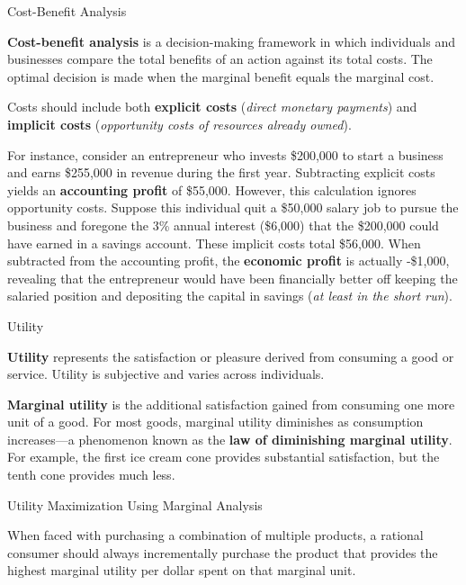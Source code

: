 \documentclass[10pt]{article}
\begin{document}
  \begin{core}{Cost-Benefit Analysis}

    \textbf{Cost-benefit analysis} is a decision-making framework in which individuals and businesses compare the total benefits of an action against its total costs. The optimal decision is made when the marginal benefit equals the marginal cost.

    Costs should include both \textbf{explicit costs} (\textit{direct monetary payments}) and \textbf{implicit costs} (\textit{opportunity costs of resources already owned}).

    For instance, consider an entrepreneur who invests \$200,000 to start a business and earns \$255,000 in revenue during the first year. Subtracting explicit costs yields an \textbf{accounting profit} of \$55,000. However, this calculation ignores opportunity costs. Suppose this individual quit a \$50,000 salary job to pursue the business and foregone the 3\% annual interest (\$6,000) that the \$200,000 could have earned in a savings account. These implicit costs total \$56,000. When subtracted from the accounting profit, the \textbf{economic profit} is actually -\$1,000, revealing that the entrepreneur would have been financially better off keeping the salaried position and depositing the capital in savings (\textit{at least in the short run}).

  \end{core}

  \begin{core}{Utility}

    \textbf{Utility} represents the satisfaction or pleasure derived from consuming a good or service. Utility is subjective and varies across individuals.

    \textbf{Marginal utility} is the additional satisfaction gained from consuming one more unit of a good. For most goods, marginal utility diminishes as consumption increases---a phenomenon known as the \textbf{law of diminishing marginal utility}. For example, the first ice cream cone provides substantial satisfaction, but the tenth cone provides much less.

  \end{core} 

  \begin{core}{Utility Maximization Using Marginal Analysis}

    When faced with purchasing a combination of multiple products, a rational consumer should always incrementally purchase the product that provides the highest marginal utility per dollar spent on that marginal unit.

  \end{core}
\end{document}
